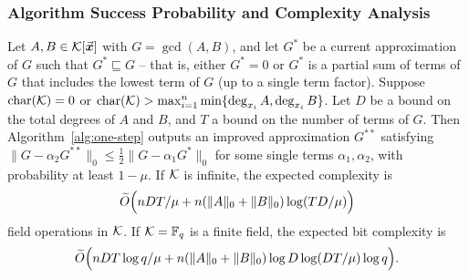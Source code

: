 \documentclass{article}
\numberwithin{equation}{section}
\begin{document}
\subsubsection*{Algorithm Success Probability and Complexity Analysis}

\begin{theorem}\label{them-one-step}
Let $A, B \in {\mathcal{K}}[\vec{\boldsymbol{x}}]$ with $G = \gcd(A,B)$, and let $G^*$ be a current approximation of $G$ such that $G^* \sqsubseteq G$ -- that is, either $G^* = 0$ or $G^*$ is a partial sum of terms of $G$ that includes the lowest term of $G$ (up to a single term factor). Suppose $\operatorname{char}({\mathcal{K}}) = 0$ or $\operatorname{char}({\mathcal{K}}) > \max_{i=1}^n\min\{\deg_{x_i} A,\deg_{x_i} B\}$. Let $D$ be a bound on the total degrees of $A$ and $B$, and $T$ a bound on the number of terms of $G$. Then Algorithm~\ref{alg:one-step} outputs an improved approximation $G^{**}$ satisfying
%
$\|G - \alpha_2 G^{**}\|_0 \le \frac{1}{2} \|G - \alpha_1 G^*\|_0$
%
for some single terms $\alpha_1, \alpha_2$, with probability at least $1-\mu$.
%
If ${\mathcal{K}}$ is infinite, the expected complexity is
\[
\widetilde{O}\Bigl( n D T /\mu+ n(\|A\|_0 + \|B\|_0) \log (TD/\mu) \Bigr)
\]
field operations in ${\mathcal{K}}$.
%
If ${\mathcal{K}} = \mathbb{F}_q$ is a finite field, the expected bit complexity is
%
\[
\widetilde{O}\Bigl( n D T \log q / \mu+ n(\|A\|_0 + \|B\|_0) \log D\log(DT/\mu)\log q \Bigr).
\]

\end{theorem}
\end{document}
